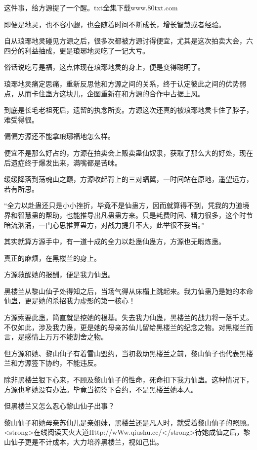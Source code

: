
\begin{this_body}

这件事，给方源提了一个醒。txt全集下载www.80txt.com

即便是地灵，也不容小觑，也会随着时间不断成长，增长智慧或者经验。

自从琅琊地灵碰见方源之后，很多次都被方源讨得便宜，尤其是这次拍卖大会，六四分的利益抽成，更是琅琊地灵吃了一记大亏。

俗话说吃亏是福，这点体现在琅琊地灵的身上，便是变得聪明了。

琅琊地灵痛定思痛，重新反思他和方源之间的关系，终于认定彼此之间的优势弱点，从而卡住蛊方这块儿，企图重新在和方源的合作中占据上风。

到底是长毛老祖死后，遗留的执念所变。方源这次还真的被琅琊地灵卡住了脖子，难受得很。

偏偏方源还不能拿琅琊福地怎么样。

便宜不是那么好占的，方源在拍卖会上贩卖蛊仙奴隶，获取了那么大的好处，现在后遗症终于爆发出来，满嘴都是苦味。

缓缓降落到荡魂山之巅，方源收起背上的三对蝠翼，一时间站在原地，遥望远方，若有所思。

“全力以赴蛊还只是小小挫折，毕竟不是仙蛊方，因而就算得不到，凭我的力道境界和智慧蛊的帮助，也能推导出凡蛊蛊方来。只是耗费时间、精力很多，这个时节暗流汹涌，一门心思推算蛊方，对战力提升不大，此举很不妥当。”

其实就算方源手中，有一道十成的全力以赴蛊仙蛊方，方源也无暇炼蛊。

真正的麻烦，在黑楼兰的身上。

方源救醒她的报酬，便是我力仙蛊。

黑楼兰从黎山仙子处得知之后，当场气得从床榻上跳起来。我力仙蛊乃是她的本命仙蛊，更是她的杀招我力虚影的第一核心！

方源索要此蛊，简直就是挖她的根基。失去我力仙蛊，黑楼兰的战力将一落千丈。不仅如此，涉及我力蛊，更是她的母亲苏仙儿留给黑楼兰的纪念之物。对黑楼兰而言，是感情上万万不能割舍之物。

但方源和她、黎山仙子有着雪山盟约，当初救助黑楼兰之前，黎山仙子也代表黑楼兰和方源签下协约，不能违反。

除非黑楼兰狠下心来，不顾及黎山仙子的性命，死命扣下我力仙蛊。这种情况下，方源也拿她没有办法。毕竟当初签下合约，不是黑楼兰她本人。

但黑楼兰又怎么忍心黎山仙子出事？

黎山仙子和她母亲苏仙儿是亲姐妹，黑楼兰还是凡人时，就受着黎山仙子的照顾。<strong>在线阅读天火大道Http://wWw.qiushu.cc/</strong>待她成仙之后，黎山仙子更是不计成本，大力培养黑楼兰，视如己出。


\end{this_body}
